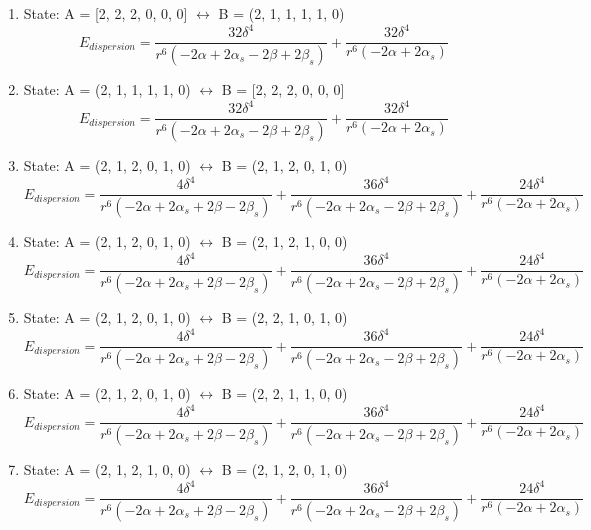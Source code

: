 \documentclass[12pt,a4paper]{article}
\begin{document}
\begin{enumerate}
 \item State: A = [2, 2, 2, 0, 0, 0] $\leftrightarrow$ B = (2, 1, 1, 1, 1, 0) 
$$E_{dispersion} =\frac{32 \delta^{4}}{r^{6} \left(- 2 \alpha + 2 \alpha_{s} - 2 \beta + 2 \beta_{s}\right)} + \frac{32 \delta^{4}}{r^{6} \left(- 2 \alpha + 2 \alpha_{s}\right)}$$
 \item State: A = (2, 1, 1, 1, 1, 0) $\leftrightarrow$ B = [2, 2, 2, 0, 0, 0] 
$$E_{dispersion} =\frac{32 \delta^{4}}{r^{6} \left(- 2 \alpha + 2 \alpha_{s} - 2 \beta + 2 \beta_{s}\right)} + \frac{32 \delta^{4}}{r^{6} \left(- 2 \alpha + 2 \alpha_{s}\right)}$$
 \item State: A = (2, 1, 2, 0, 1, 0) $\leftrightarrow$ B = (2, 1, 2, 0, 1, 0) 
$$E_{dispersion} =\frac{4 \delta^{4}}{r^{6} \left(- 2 \alpha + 2 \alpha_{s} + 2 \beta - 2 \beta_{s}\right)} + \frac{36 \delta^{4}}{r^{6} \left(- 2 \alpha + 2 \alpha_{s} - 2 \beta + 2 \beta_{s}\right)} + \frac{24 \delta^{4}}{r^{6} \left(- 2 \alpha + 2 \alpha_{s}\right)}$$
 \item State: A = (2, 1, 2, 0, 1, 0) $\leftrightarrow$ B = (2, 1, 2, 1, 0, 0) 
$$E_{dispersion} =\frac{4 \delta^{4}}{r^{6} \left(- 2 \alpha + 2 \alpha_{s} + 2 \beta - 2 \beta_{s}\right)} + \frac{36 \delta^{4}}{r^{6} \left(- 2 \alpha + 2 \alpha_{s} - 2 \beta + 2 \beta_{s}\right)} + \frac{24 \delta^{4}}{r^{6} \left(- 2 \alpha + 2 \alpha_{s}\right)}$$
 \item State: A = (2, 1, 2, 0, 1, 0) $\leftrightarrow$ B = (2, 2, 1, 0, 1, 0) 
$$E_{dispersion} =\frac{4 \delta^{4}}{r^{6} \left(- 2 \alpha + 2 \alpha_{s} + 2 \beta - 2 \beta_{s}\right)} + \frac{36 \delta^{4}}{r^{6} \left(- 2 \alpha + 2 \alpha_{s} - 2 \beta + 2 \beta_{s}\right)} + \frac{24 \delta^{4}}{r^{6} \left(- 2 \alpha + 2 \alpha_{s}\right)}$$
 \item State: A = (2, 1, 2, 0, 1, 0) $\leftrightarrow$ B = (2, 2, 1, 1, 0, 0) 
$$E_{dispersion} =\frac{4 \delta^{4}}{r^{6} \left(- 2 \alpha + 2 \alpha_{s} + 2 \beta - 2 \beta_{s}\right)} + \frac{36 \delta^{4}}{r^{6} \left(- 2 \alpha + 2 \alpha_{s} - 2 \beta + 2 \beta_{s}\right)} + \frac{24 \delta^{4}}{r^{6} \left(- 2 \alpha + 2 \alpha_{s}\right)}$$
 \item State: A = (2, 1, 2, 1, 0, 0) $\leftrightarrow$ B = (2, 1, 2, 0, 1, 0) 
$$E_{dispersion} =\frac{4 \delta^{4}}{r^{6} \left(- 2 \alpha + 2 \alpha_{s} + 2 \beta - 2 \beta_{s}\right)} + \frac{36 \delta^{4}}{r^{6} \left(- 2 \alpha + 2 \alpha_{s} - 2 \beta + 2 \beta_{s}\right)} + \frac{24 \delta^{4}}{r^{6} \left(- 2 \alpha + 2 \alpha_{s}\right)}$$

\end{enumerate}
\end{document}
